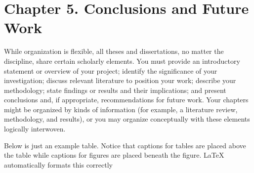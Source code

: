 \chapter{Chapter 5. Conclusions and Future Work}

While organization is flexible, all theses and dissertations, no matter the discipline, share certain scholarly elements. You must provide an introductory statement or overview of your project; identify the significance of your investigation; discuss relevant literature to position your work; describe your methodology; state findings or results and their implications; and present conclusions and, if appropriate, recommendations for future work. Your chapters might be organized by kinds of information (for example, a literature review, methodology, and results), or you may organize conceptually with these elements logically interwoven.

Below is just an example table. Notice that captions for tables are placed above the table while captions for figures are placed beneath the figure. LaTeX automatically formats this correctly
\begin{table}[ht]

\caption[Frequencies for equal-tempered scale, $A_4=440$]{Frequencies for equal-tempered scale, $A_4=440$ Hz. This table shows only the first five notes of a chromatic scale starting on $C_0$} %

\begin{center}
\end{center}


\end{table}

